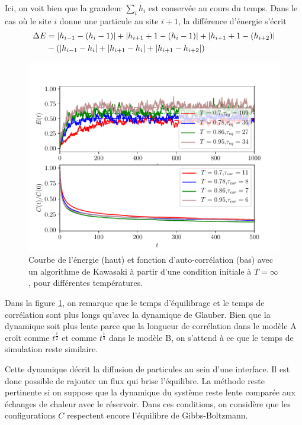 Ici, on voit bien que la grandeur $\sum_i h_i$ est conservée au cours du temps. Dans le cas où le site $i$ donne une particule au site $i+1$, la différence d'énergie s'écrit	
\begin{align}
	\Delta E &= |h_{i-1}-(h_i - 1)| + |h_{i+1} + 1 -(h_i- 1)| + |h_{i+1} + 1-(h_{i+2} )|  \nonumber \\
	& - \left( |h_{i-1}-h_i| + |h_{i+1} -h_i| + |h_{i+1}-h_{i+2}| \right)
\end{align}

\begin{figure}[t]
	\centering
	\includegraphics[scale=1]{numerical/sos-kaw-eq-cor.pdf}
	\caption{Courbe de l'énergie (haut) et fonction d'auto-corrélation (bas) avec un algorithme de Kawasaki à partir d'une condition initiale à $T=\infty$, pour différentes températures.}
	\label{eq-kaw}
\end{figure}
Dans la figure \ref{eq-kaw}, on remarque que le temps d'équilibrage et le temps de corrélation sont plus longs qu'avec la dynamique de Glauber. Bien que la dynamique soit plus lente parce que la longueur de corrélation dans le modèle A croît comme $t^\frac{1}{2}$ et comme $t^\frac{1}{3}$ dans le modèle B, on s'attend à ce que le temps de simulation reste similaire. 

Cette dynamique décrit la diffusion de particules au sein d'une interface. Il est donc possible de rajouter un flux qui brise l'équilibre. La méthode reste pertinente si on suppose que la dynamique du système reste lente comparée aux échanges de chaleur avec le réservoir. Dans ces conditions, on considère que les configurations $C$ respectent encore l'équilibre de Gibbs-Boltzmann. 


